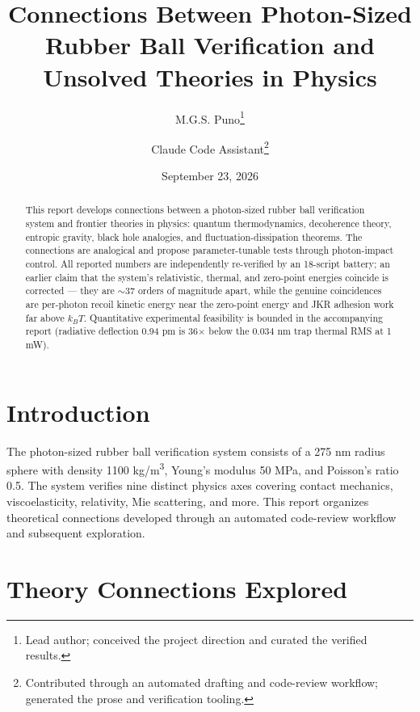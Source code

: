\documentclass[11pt]{article}
\title{Connections Between Photon-Sized Rubber Ball Verification and Unsolved Theories in Physics}
\author{M.G.S. Puno\thanks{Lead author; conceived the project direction and curated the verified results.}%
\and Claude Code Assistant\thanks{Contributed through an automated drafting and code-review workflow; generated the prose and verification tooling.}}
\date{September 23, 2026}
\begin{document}
\maketitle

\begin{abstract}
This report develops connections between a photon-sized rubber ball verification system and frontier theories in physics: quantum thermodynamics, decoherence theory, entropic gravity, black hole analogies, and fluctuation-dissipation theorems. The connections are analogical and propose parameter-tunable tests through photon-impact control. All reported numbers are independently re-verified by an 18-script battery; an earlier claim that the system's relativistic, thermal, and zero-point energies coincide is corrected — they are $\sim$37 orders of magnitude apart, while the genuine coincidences are per-photon recoil kinetic energy near the zero-point energy and JKR adhesion work far above $k_BT$. Quantitative experimental feasibility is bounded in the accompanying report (radiative deflection 0.94 pm is 36$\times$ below the 0.034 nm trap thermal RMS at 1 mW).
\end{abstract}

\section{Introduction}
The photon-sized rubber ball verification system consists of a 275 nm radius sphere with density 1100 kg/m\textsuperscript{3}, Young's modulus 50 MPa, and Poisson's ratio 0.5. The system verifies nine distinct physics axes covering contact mechanics, viscoelasticity, relativity, Mie scattering, and more. This report organizes theoretical connections developed through an automated code-review workflow and subsequent exploration.

\section{Theory Connections Explored}
\end{document}
